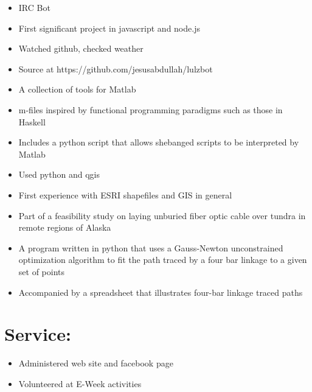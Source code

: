 \documentclass{resume}
\begin{document}
    \small
    \begin{itemize}
        \item IRC Bot
        \item First significant project in javascript and node.js
        \item Watched github, checked weather
        \item Source at https://github.com/jesusabdullah/lulzbot
    \end{itemize}\normalsize

    \small
    \begin{itemize}
        \item A collection of tools for Matlab
        \item m-files inspired by functional programming paradigms such as those in Haskell
        \item Includes a python script that allows shebanged scripts to be interpreted by Matlab
    \end{itemize}\normalsize
        
    
    \small
    \begin{itemize}
         \item Used python and qgis
         \item First experience with ESRI shapefiles and GIS in general
         \item Part of a feasibility study on laying unburied fiber optic cable over tundra in remote regions of Alaska
    \end{itemize}
    \normalsize

    \small
    \begin{itemize}
        \item A program written in python that uses a Gauss-Newton unconstrained optimization algorithm to fit the path traced by a four bar linkage to a given set of points
        \item Accompanied by a spreadsheet that illustrates four-bar linkage traced paths
    \end{itemize}
    \normalsize

\section{Service:}
    \small
    \begin{itemize}
        \item Administered web site and facebook page
        \item Volunteered at E-Week activities
    \end{itemize}
    \normalsize
        
\end{document}
